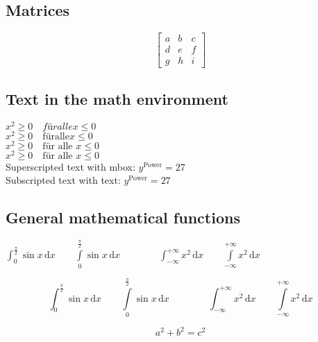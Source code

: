 \documentclass[10pt, a4paper]{article}
\numberwithin{equation}{section}
\numberwithin{figure}{section}
\begin{document}
\subsection{Matrices}

\begin{equation}
\begin{bmatrix}
  a & b & c \\
  d & e & f \\
  g & h & i
 \end{bmatrix}
\end{equation}

\subsection{Text in the math environment}
\( x^2 \geq 0\quad für alle x \leq 0 \)\\ %
\( x^2 \geq 0\quad \mathrm{für alle } x \leq 0 \)\\ %
\( x^2 \geq 0\quad \mbox{für alle } x \leq 0 \)\\ %
\( x^2 \geq 0\quad \text{für alle } x \leq 0 \)\\ %
Superscripted text with mbox: \quad \( y^{\mbox{Power}}=27\)\\
Subscripted text with text: \quad \( y^{\text{Power}}=27\)

\subsection{General mathematical functions}

\( \int_{0}^{\frac{\pi}{2}} \sin x\,\mathrm{d}x \qquad
\int\limits_{0}^{\frac{\pi}{2}} \sin x\,\mathrm{d}x \qquad\qquad
\int_{-\infty}^{+\infty}x^2\,\mathrm{d}x \qquad
\int\limits_{-\infty}^{+\infty}x^2\,\mathrm{d}x\)

\[ \int_{0}^{\frac{\pi}{2}} \sin x\,\mathrm{d}x \qquad
\int\limits_{0}^{\frac{\pi}{2}} \sin x\,\mathrm{d}x \qquad\qquad
\int_{-\infty}^{+\infty}x^2\,\mathrm{d}x \qquad
\int\limits_{-\infty}^{+\infty}x^2\,\mathrm{d}x\]



\begin{equation}
 	a^2 + b^2 = c^2\label{eq:a}
\end{equation}
\end{document}
